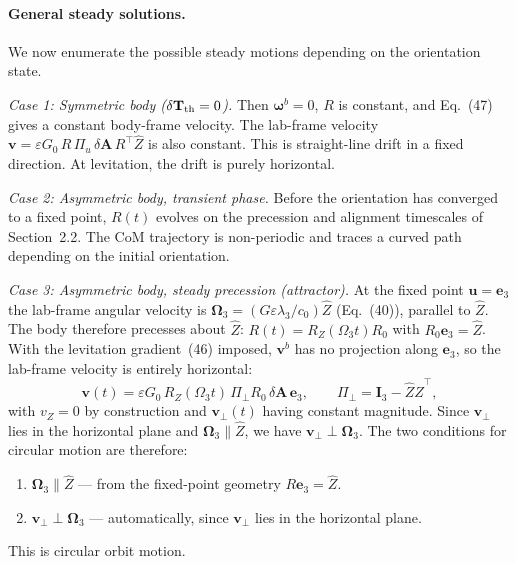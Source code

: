 \documentclass[11pt]{article}
\newcommand{\vect}[1]{\bm{#1}}
\newcommand{\T}{^{\!\top}}
\begin{document}
\paragraph{General steady solutions.} We now enumerate the possible steady motions depending on the orientation state.

\emph{Case 1: Symmetric body ($\delta\mathbf T_{\rm th}=0$).} Then $\vect\omega^b=0$, $R$ is constant, and Eq.~(47) gives a constant body-frame velocity. The lab-frame velocity $\vect v=\varepsilon G_0\,R\,\Pi_u\,\delta\mathbf A\,R\T\hat Z$ is also constant. This is straight-line drift in a fixed direction. At levitation, the drift is purely horizontal.

\emph{Case 2: Asymmetric body, transient phase.} Before the orientation has converged to a fixed point, $R(t)$ evolves on the precession and alignment timescales of Section~2.2. The CoM trajectory is non-periodic and traces a curved path depending on the initial orientation.

\emph{Case 3: Asymmetric body, steady precession (attractor).} At the fixed point $\vect u=\vect e_3$ the lab-frame angular velocity is $\vect\Omega_3=(G\varepsilon\lambda_3/c_0)\hat Z$ (Eq.~(40)), parallel to $\hat Z$. The body therefore precesses about $\hat Z$: $R(t)=R_Z(\Omega_3t)R_0$ with $R_0\vect e_3=\hat Z$. With the levitation gradient~(46) imposed, $\vect v^b$ has no projection along $\vect e_3$, so the lab-frame velocity is entirely horizontal:
\begin{equation}
  \vect v(t)=\varepsilon G_0\,R_Z(\Omega_3t)\,\Pi_\perp R_0\,\delta\mathbf A\,\vect e_3,\qquad \Pi_\perp=\mathbf I_3-\hat Z\hat Z\T,
\end{equation}
with $v_Z=0$ by construction and $\vect v_\perp(t)$ having constant magnitude. Since $\vect v_\perp$ lies in the horizontal plane and $\vect\Omega_3\parallel\hat Z$, we have $\vect v_\perp\perp\vect\Omega_3$. The two conditions for circular motion are therefore:
\begin{enumerate}
  \item $\vect\Omega_3\parallel\hat Z$ --- from the fixed-point geometry $R\vect e_3=\hat Z$.
  \item $\vect v_\perp\perp\vect\Omega_3$ --- automatically, since $\vect v_\perp$ lies in the horizontal plane.
\end{enumerate}
This is circular orbit motion.
\end{document}
